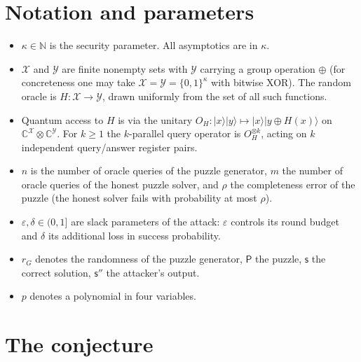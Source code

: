 \documentclass{aicr-conjecture}
\newcommand{\puz}{\mathsf{P}}
\newcommand{\solu}{\mathsf{s}}
\newcommand{\solatt}{\mathsf{s}''}
\begin{document}
\section{Notation and parameters}\label{sec:notation}

\begin{itemize}
  \item $\kappa \in \mathbb{N}$ is the security parameter. All asymptotics
    are in $\kappa$.
  \item $\mathcal{X}$ and $\mathcal{Y}$ are finite nonempty sets with
    $\mathcal{Y}$ carrying a group operation $\oplus$ (for concreteness one
    may take $\mathcal{X} = \mathcal{Y} = \{0,1\}^{\kappa}$ with bitwise
    XOR). The random oracle is $H \colon \mathcal{X} \to \mathcal{Y}$,
    drawn uniformly from the set of all such functions.
  \item Quantum access to $H$ is via the unitary
    $O_H \colon |x\rangle|y\rangle \mapsto |x\rangle|y \oplus H(x)\rangle$
    on $\mathbb{C}^{\mathcal{X}} \otimes \mathbb{C}^{\mathcal{Y}}$. For
    $k \ge 1$ the $k$-parallel query operator is $O_H^{\otimes k}$, acting
    on $k$ independent query/answer register pairs.
  \item $n$ is the number of oracle queries of the puzzle generator, $m$
    the number of oracle queries of the honest puzzle solver, and $\rho$
    the completeness error of the puzzle (the honest solver fails with
    probability at most $\rho$).
  \item $\varepsilon, \delta \in (0,1]$ are slack parameters of the
    attack: $\varepsilon$ controls its round budget and $\delta$ its
    additional loss in success probability.
  \item $r_G$ denotes the randomness of the puzzle generator, $\puz$ the
    puzzle, $\solu$ the correct solution, $\solatt$ the attacker's output.
  \item $p$ denotes a polynomial in four variables.
\end{itemize}

\section{The conjecture}\label{sec:conjectures}
\end{document}
